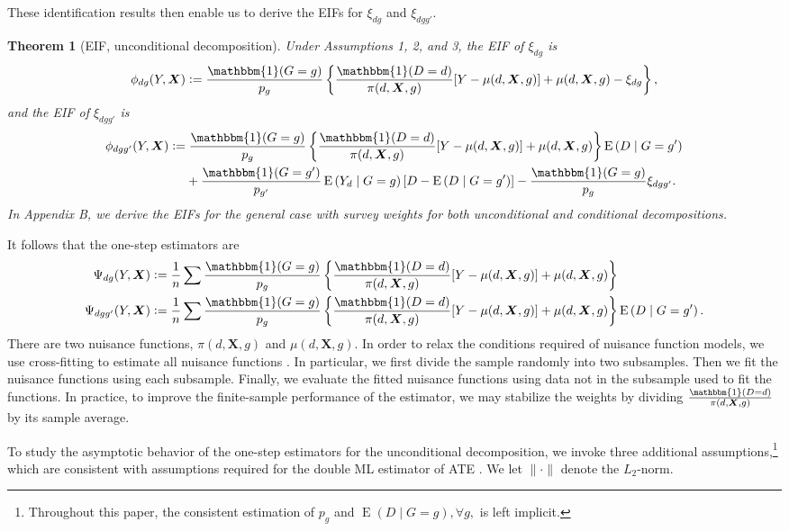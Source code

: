 \documentclass[12pt,a4paper]{article}
\newtheorem{prop}{Theorem}
\newcommand{\E}{\operatorname{E}}
\def\X{{\boldsymbol X}}
\def\one{\mathbbm{1}}
\newcommand{\defeq}{\vcentcolon=}
\begin{document}
These identification results then enable us to derive the EIFs for $\xi_{dg}$ and $\xi_{dgg'}$.
\begin{prop}[EIF, unconditional decomposition]
Under Assumptions 1, 2, and 3, the EIF of $\xi_{dg}$ is
$$\phi_{dg}(Y,\X) \defeq \frac{\one(G=g)}{p_g} \left\{ \frac{\one(D=d)}{\pi(d, \X,g)} [Y-\mu(d,\X,g)] + \mu(d,\X,g) - \xi_{dg} \right\},$$ 
and the EIF of $\xi_{dgg'}$ is
\begin{align*}
    \phi_{dgg'}(Y,\X) &\defeq \frac{\one(G=g)}{p_g}  \left\{\frac{\one(D=d)}{\pi(d,\X,g)}[Y-\mu(d,\X,g)] + \mu(d,\X,g) \right\} \E \left(D \mid G=g' \right) \\
    &\phantom{{}={}} + \frac{\one(G=g')}{p_{g'}} \E \left(Y_d \mid G=g \right) \left[D - \E \left(D \mid G=g' \right) \right] - \frac{\one(G=g)}{p_g} \xi_{dgg'}.
\end{align*}
In Appendix B, we derive the EIFs for the general case with survey weights for both unconditional and conditional decompositions. 
\end{prop}
It follows that the one-step estimators are
\begin{align*}
    \Psi_{dg}(Y,\X) &\defeq \frac{1}{n} \sum \frac{\one(G=g)}{p_g} \left\{ \frac{\one(D=d)}{\pi(d, \X,g)} [Y-\mu(d,\X,g)] + \mu(d,\X,g)\right\} \\
    \Psi_{dgg'}(Y,\X) &\defeq \frac{1}{n} \sum \frac{\one(G=g)}{p_g}  \left\{\frac{\one(D=d)}{\pi(d,\X,g)}[Y-\mu(d,\X,g)] + \mu(d,\X,g) \right\} \E \left(D \mid G=g' \right).
\end{align*}
There are two nuisance functions, $\pi(d,\X,g)$ and $\mu(d,\X,g)$. In order to relax the conditions required of nuisance function models, we use cross-fitting to estimate all nuisance functions \citep{kennedy_semiparametric_2022, chernozhukov_double/debiased_2018}. In particular, we first divide the sample randomly into two subsamples. Then we fit the nuisance functions using each subsample. Finally, we evaluate the fitted nuisance functions using data not in the subsample used to fit the functions. In practice, to improve the finite-sample performance of the estimator, we may stabilize the weights by dividing $\frac{\one(D=d)}{\pi(d,\X,g)}$ by its sample average.  

To study the asymptotic behavior of the one-step estimators for the unconditional decomposition, we invoke three additional assumptions,\footnote{Throughout this paper, the consistent estimation of $p_g$ and $\E(D \mid G=g), \forall g,$ is left implicit.} which are consistent with assumptions required for the double ML estimator of ATE \citep{kennedy_semiparametric_2022, chernozhukov_double/debiased_2018}. We let $\| \cdot \|$ denote the $L_2$-norm. 
\end{document}
